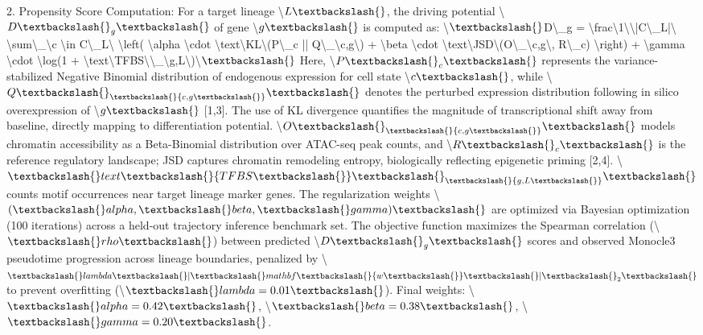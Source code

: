 \documentclass[11pt,a4paper]{article}
\begin{document}
2. Propensity Score Computation: For a target lineage \textbackslash{}$L\textbackslash{}$, the driving potential \textbackslash{}$D\textbackslash{}_g\textbackslash{}$ of gene \textbackslash{}$g\textbackslash{}$ is computed as:
\textbackslash{}$\textbackslash{}$D\textbackslash{}_g = \textbackslash{}frac\textbackslash{}{1\textbackslash{}}\textbackslash{}{|C\textbackslash{}_L|\textbackslash{}} \textbackslash{}sum\textbackslash{}_\textbackslash{}{c \textbackslash{}in C\textbackslash{}_L\textbackslash{}} \textbackslash{}left( \textbackslash{}alpha \textbackslash{}cdot \textbackslash{}text\textbackslash{}{KL\textbackslash{}}(P\textbackslash{}_c || Q\textbackslash{}_\textbackslash{}{c,g\textbackslash{}}) + \textbackslash{}beta \textbackslash{}cdot \textbackslash{}text\textbackslash{}{JSD\textbackslash{}}(O\textbackslash{}_\textbackslash{}{c,g\textbackslash{}}, R\textbackslash{}_c) \textbackslash{}right) + \textbackslash{}gamma \textbackslash{}cdot \textbackslash{}log(1 + \textbackslash{}text\textbackslash{}{TFBS\textbackslash{}}\textbackslash{}_\textbackslash{}{g,L\textbackslash{}})\textbackslash{}$\textbackslash{}$
Here, \textbackslash{}$P\textbackslash{}_c\textbackslash{}$ represents the variance-stabilized Negative Binomial distribution of endogenous expression for cell state \textbackslash{}$c\textbackslash{}$, while \textbackslash{}$Q\textbackslash{}_\textbackslash{}{c,g\textbackslash{}}\textbackslash{}$ denotes the perturbed expression distribution following in silico overexpression of \textbackslash{}$g\textbackslash{}$ [1,3]. The use of KL divergence quantifies the magnitude of transcriptional shift away from baseline, directly mapping to differentiation potential. \textbackslash{}$O\textbackslash{}_\textbackslash{}{c,g\textbackslash{}}\textbackslash{}$ models chromatin accessibility as a Beta-Binomial distribution over ATAC-seq peak counts, and \textbackslash{}$R\textbackslash{}_c\textbackslash{}$ is the reference regulatory landscape; JSD captures chromatin remodeling entropy, biologically reflecting epigenetic priming [2,4]. \textbackslash{}$\textbackslash{}text\textbackslash{}{TFBS\textbackslash{}}\textbackslash{}_\textbackslash{}{g,L\textbackslash{}}\textbackslash{}$ counts motif occurrences near target lineage marker genes.
The regularization weights \textbackslash{}$(\textbackslash{}alpha, \textbackslash{}beta, \textbackslash{}gamma)\textbackslash{}$ are optimized via Bayesian optimization (100 iterations) across a held-out trajectory inference benchmark set. The objective function maximizes the Spearman correlation (\textbackslash{}$\textbackslash{}rho\textbackslash{}$) between predicted \textbackslash{}$D\textbackslash{}_g\textbackslash{}$ scores and observed Monocle3 pseudotime progression across lineage boundaries, penalized by \textbackslash{}$\textbackslash{}lambda \textbackslash{}|\textbackslash{}mathbf\textbackslash{}{w\textbackslash{}}\textbackslash{}|\textbackslash{}_2\textbackslash{}$ to prevent overfitting (\textbackslash{}$\textbackslash{}lambda=0.01\textbackslash{}$). Final weights: \textbackslash{}$\textbackslash{}alpha=0.42\textbackslash{}$, \textbackslash{}$\textbackslash{}beta=0.38\textbackslash{}$, \textbackslash{}$\textbackslash{}gamma=0.20\textbackslash{}$.
\end{document}
